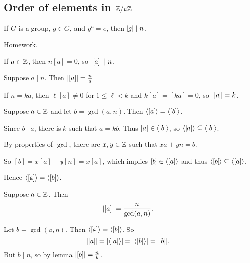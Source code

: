 \documentclass[12pt,letterpaper]{report}
\begin{document}
\pagebreak
\subsection[Order of elements in Z/nZ]{Order of elements in $\mathbb{Z}/{n}\mathbb{Z}$}

\begin{lem}{}{}
  If $G$ is a group, $g \in G$, and $g^n = e$, then $\lvert g\rvert \mid n$.
\end{lem}

\begin{thmproof}
  Homework.
\end{thmproof}

If $a \in \mathbb{Z}$, then $n[a] = 0$, so $\lvert[a]\rvert \mid n$.

\begin{lem}{}{}
  Suppose $a \mid n$.
  Then $\lvert[a]\rvert = \frac{n}{a}$.
\end{lem}

\begin{thmproof}
  If $n = ka$, then $\ell[a] \neq 0$ for $1 \leq \ell < k$ and $k[a] = [ka] = 0$, so
  $\lvert[a]\rvert = k$.
\end{thmproof}

\begin{lem}{}{}
  Suppose $a \in \mathbb{Z}$ and let $b = \gcd(a, n)$.
  Then $\langle[a]\rangle = \langle[b]\rangle$.
\end{lem}

\begin{thmproof}
  Since $b \mid a$, there is $k$ such that $a = kb$.
  Thus $[a] \in \langle[b]\rangle$, so $\langle[a]\rangle \subseteq \langle[b]\rangle$.

  By properties of $\gcd$, there are $x, y \in \mathbb{Z}$ such that $xa + yn = b$.

  So $[b] = x[a] + y[n] = x[a]$, which implies $[b] \in \langle[a]\rangle$ and thus
  $\langle[b]\rangle \subseteq \langle[a]\rangle$.

  Hence $\langle[a]\rangle = \langle[b]\rangle$.
\end{thmproof}

\begin{prop}{}{}
  Suppose $a \in \mathbb{Z}$.
  Then
  \[ \lvert[a]\rvert = \frac{n}{\gcd(a, n)}. \]
\end{prop}

\begin{thmproof}
  Let $b = \gcd(a, n)$.
  Then $\langle[a]\rangle = \langle[b]\rangle$.
  So
  \[ \lvert[a]\rvert = \lvert\langle[a]\rangle\rvert = \lvert\langle[b]\rangle\rvert = \lvert[b]\rvert. \]
  But $b \mid n$, so by lemma $\lvert[b]\rvert = \frac{n}{b}$.
\end{thmproof}
\end{document}

